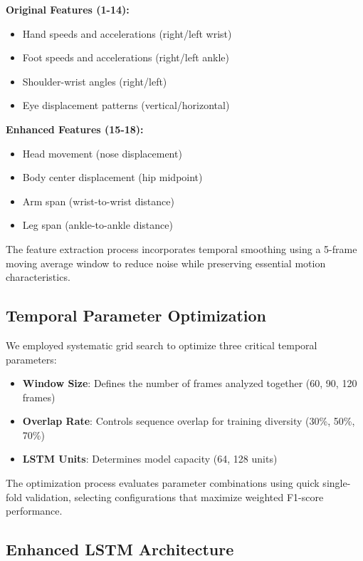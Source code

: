 \documentclass[a4paper,11pt]{article}
\begin{document}
\textbf{Original Features (1-14):}
\begin{itemize}
\item Hand speeds and accelerations (right/left wrist)
\item Foot speeds and accelerations (right/left ankle)  
\item Shoulder-wrist angles (right/left)
\item Eye displacement patterns (vertical/horizontal)
\end{itemize}

\textbf{Enhanced Features (15-18):}
\begin{itemize}
\item Head movement (nose displacement)
\item Body center displacement (hip midpoint)
\item Arm span (wrist-to-wrist distance)
\item Leg span (ankle-to-ankle distance)
\end{itemize}

The feature extraction process incorporates temporal smoothing using a 5-frame moving average window to reduce noise while preserving essential motion characteristics.

\subsection{Temporal Parameter Optimization}

We employed systematic grid search to optimize three critical temporal parameters:

\begin{itemize}
\item \textbf{Window Size}: Defines the number of frames analyzed together (60, 90, 120 frames)
\item \textbf{Overlap Rate}: Controls sequence overlap for training diversity (30\%, 50\%, 70\%)
\item \textbf{LSTM Units}: Determines model capacity (64, 128 units)
\end{itemize}

The optimization process evaluates parameter combinations using quick single-fold validation, selecting configurations that maximize weighted F1-score performance.

\subsection{Enhanced LSTM Architecture}
\end{document}
